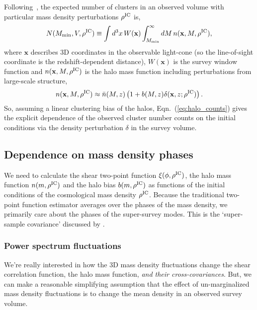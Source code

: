 \documentclass[preprint]{aastex}
\newcommand{\xv}{\mathbf{x}}
\newcommand{\skyangle}{\phi}
\newcommand{\rhoic}{\rho^{\rm IC}}
\newcommand{\nclust}{N}
\newcommand{\Mmin}{M_\text{min}}
\begin{document}
Following~\citet{lima2004}, the expected number of clusters in an observed volume with 
particular mass density perturbations $\rhoic$ is, 
\begin{equation}
	\nclust(\Mmin, V, \rhoic) \equiv 
	\int d^{3}x\, W(\xv) \int_{\Mmin}^{\infty} dM\, n(\xv, M, \rhoic),
\end{equation}
where $\xv$ describes 3D coordinates in the observable light-cone (so the 
line-of-sight coordinate is the redshift-dependent distance),
$W(\xv)$ is the survey window function and $n(\xv, M, \rhoic)$ is the
halo mass function including perturbations from large-scale structure,
\begin{equation}\label{eq:halo_counts}
	n(\xv, M, \rhoic) \approx \bar{n}(M, z) \left(
	1 + b(M, z) \delta(\xv, z; \rhoic)
	\right).
\end{equation}
So, assuming a linear clustering bias of the halos, Eqn.~(\ref{eq:halo_counts}) gives the 
explicit dependence of the observed cluster number counts on the initial conditions 
via the density perturbation $\delta$ in the survey volume.

\subsection{Dependence on mass density phases} %
\label{sub:dependence_on_mass_density_phases}
We need to calculate the shear two-point function $\xi(\skyangle, \rhoic)$, 
the halo mass function $n(m, \rhoic)$
and the halo bias $b(m, \rhoic)$ as functions of the initial conditions of the 
cosmological mass density $\rhoic$. 
Because the traditional two-point function estimator averages over the phases 
of the mass density, we primarily care about the phases of the super-survey 
modes. This is the `super-sample covariance' discussed by 
\citet{takada2013}.

\subsubsection{Power spectrum fluctuations}
We're really interested in how the 3D mass density fluctuations change the
shear correlation function, the halo mass function, \emph{and their 
cross-covariances}. But, we can make a reasonable simplifying assumption that 
the effect of un-marginalized mass density fluctuations is to change the mean density 
in an observed survey volume. 
\end{document}
